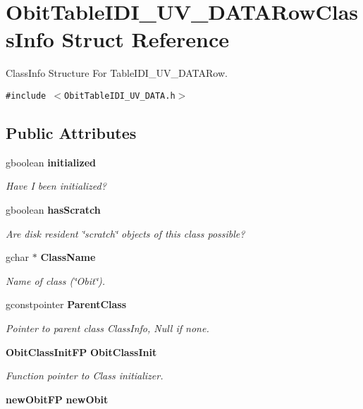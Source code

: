 \section{Obit\-Table\-IDI\_\-UV\_\-DATARow\-Class\-Info Struct Reference}
\label{structObitTableIDI__UV__DATARowClassInfo}
Class\-Info Structure For Table\-IDI\_\-UV\_\-DATARow.  


{\tt \#include $<$Obit\-Table\-IDI\_\-UV\_\-DATA.h$>$}

\subsection*{Public Attributes}
\begin{CompactItemize}
\item 
gboolean {\bf initialized}
\begin{CompactList}\small\item\em Have I been initialized? \item\end{CompactList}\item 
gboolean {\bf has\-Scratch}
\begin{CompactList}\small\item\em Are disk resident \char`\"{}scratch\char`\"{} objects of this class possible? \item\end{CompactList}\item 
gchar $\ast$ {\bf Class\-Name}
\begin{CompactList}\small\item\em Name of class (\char`\"{}Obit\char`\"{}). \item\end{CompactList}\item 
gconstpointer {\bf Parent\-Class}
\begin{CompactList}\small\item\em Pointer to parent class Class\-Info, Null if none. \item\end{CompactList}\item 
{\bf Obit\-Class\-Init\-FP} {\bf Obit\-Class\-Init}
\begin{CompactList}\small\item\em Function pointer to Class initializer. \item\end{CompactList}\item 
{\bf new\-Obit\-FP} {\bf new\-Obit}

\end{CompactItemize}
